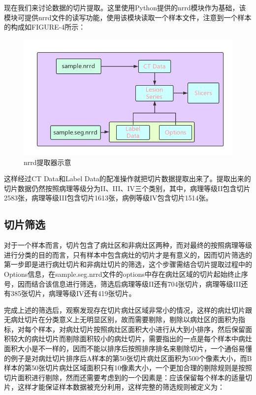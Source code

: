 \documentclass{ctexart}
\begin{document}
现在我们来讨论数据的切片提取。这里使用Python提供的nrrd模块作为基础，该模块可提供nrrd文件的读写功能，使用该模块读取一个样本文件，注意到一个样本的构成如FIGURE-4所示：
\begin{figure}[!htbp] 
\centering
\includegraphics[width=\linewidth]{img/nrrd2png.png} 
\caption{nrrd提取器示意}
\label{f4} 
\end{figure}

这样经过CT Data和Label Data的配准操作就把切片数据提取出来了。提取出来的切片数据仍然按照病理等级分为II、III、IV三个类别，其中，病理等级II包含切片2583张，病理等级III包含切片1613张，病例等级IV包含切片1514张。

\subsection{切片筛选}
对于一个样本而言，切片包含了病灶区和非病灶区两种，而对最终的按照病理等级进行分类的目的而言，只有样本中包含病灶的切片才是有意义的，因而切片筛选的第一步即是进行病灶切片和非病灶切片的筛选，这个步骤需结合切片提取过程中的Options信息，在sample.seg.nrrd文件的options中存在病灶区域的切片起始终止序号，因而结合该信息进行筛选，筛选后病理等级II还有704张切片，病理等级III还有385张切片，病理等级IV还有419张切片。

完成上述的筛选后，观察发现存在切片病灶区域非常小的情况，这样的病灶切片跟无病灶切片在分类意义上无明显区别，故而需要剔除，剔除以病灶区的面积为指标，对每个样本，对病灶切片按照病灶区面积大小进行从大到小排序，然后保留面积较大的病灶切片而剔除面积较小的病灶切片，需要指出的一点是每个样本中病灶面积大小是不一样的，因而不能以排序后按照排序排名来剔除切片，一个通俗易懂的例子是对病灶切片排序后A样本的第50张切片病灶区面积为500个像素大小，而B样本的第50张切片病灶区域面积只有10像素大小，一个更加合理的剔除规则是按照切片面积进行剔除，然而还需要考虑到的一个因素是：应该保留每个样本的适量切片，这样才能保证样本数据被充分利用，这样完整的筛选规则被定义为：
\end{document}
